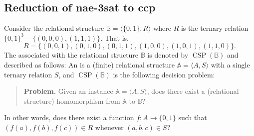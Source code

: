 \documentclass[12pt]{amsart}
\numberwithin{equation}{section}
\theoremstyle{plain}
\theoremstyle{definition}
\newcommand{\ccp}{\acs{ccp}\xspace}
\newcommand{\sat}{\acs{sat}\xspace}
\newcommand{\nae}{\acs{nae}\xspace}
\newcommand{\NP}{\acs{NP}\xspace}
\begin{document}


\subsection{Reduction of \nae-3\sat to \ccp}
\label{sec:reduction-nae-3sat}
Consider the relational structure $\mathbb B = \langle \{0, 1\}, R\rangle$
where $R$ is the ternary relation $\{0, 1\}^3 - \{(0,0,0), (1,1,1)\}$.
That is,
\[ R = \{(0,0,1), (0,1,0), (0,1,1), (1,0,0), (1,0,1), (1,1,0)\}.\]
The \csp associated with the relational structure $\mathbb B$
is denoted by $\operatorname{CSP}(\mathbb B)$ and described as follows:
An  %
is a (finite) relational structure $\mathbb A = \langle A, S \rangle$
with a single ternary relation $S$, and $\operatorname{CSP}(\mathbb B)$ is the
following decision problem:

\begin{quote}
{\bf Problem.} Given an instance $\mathbb A = \langle A, S \rangle$,
does there exist a (relational structure) homomorphism from $\mathbb A$ to $\mathbb B$?
\end{quote}

In other words, does there exist a function
$f\colon A \rightarrow \{0,1\}$ such that $(f(a), f(b), f(c)) \in R$ whenever
$(a, b, c) \in S$?
\end{document}
